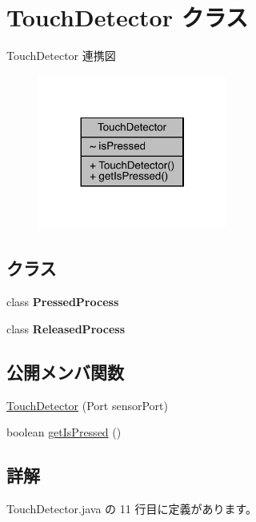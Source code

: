 \hypertarget{class_touch_detector}{}\section{Touch\+Detector クラス}
\label{class_touch_detector}


Touch\+Detector 連携図
\nopagebreak
\begin{figure}[H]
\begin{center}
\leavevmode
\includegraphics[width=176pt]{db/d4a/class_touch_detector__coll__graph}
\end{center}
\end{figure}
\subsection*{クラス}
\begin{DoxyCompactItemize}
\item 
class {\bfseries Pressed\+Process}
\item 
class {\bfseries Released\+Process}
\end{DoxyCompactItemize}
\subsection*{公開メンバ関数}
\begin{DoxyCompactItemize}
\item 
\mbox{\hyperlink{class_touch_detector_ad4818fd917a3b42985865c4e2000c3c0}{Touch\+Detector}} (Port sensor\+Port)
\item 
boolean \mbox{\hyperlink{class_touch_detector_a118eac6be889816032f993694a8dd808}{get\+Is\+Pressed}} ()
\end{DoxyCompactItemize}


\subsection{詳解}


 Touch\+Detector.\+java の 11 行目に定義があります。



